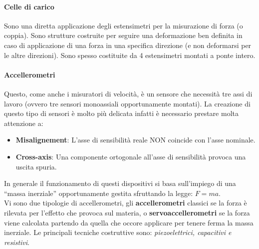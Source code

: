 \documentclass[12pt]{article}
\begin{document}
\paragraph{Celle di carico} Sono una diretta applicazione degli estensimetri per la misurazione di forza (o coppia). Sono strutture costruite per seguire una deformazione ben definita in caso di applicazione di una forza in una specifica direzione (e non deformarsi per le altre direzioni). Sono spesso costituite da 4 estensimetri montati a ponte intero.

\paragraph{Accellerometri} Questo, come anche i misuratori di velocità, è un sensore che necessità tre assi di lavoro (ovvero tre sensori monoassiali opportunamente montati). La creazione di questo tipo di sensori è molto più delicata infatti è necessario prestare molta attenzione a:
\begin{itemize}
  \item \textbf{Misalignement}: L'asse di sensibilità reale NON coincide con l'asse nominale.
  \item \textbf{Cross-axis}: Una componente ortogonale all'asse di sensibilità provoca una uscita spuria.
\end{itemize}
In generale il funzionamento di questi dispositivi si basa sull'impiego di una ``massa inerziale'' opportunamente gestita sfruttando la legge: $F=ma$.\\
Vi sono due tipologie di accellerometri, gli \textbf{accellerometri} classici se la forza è rilevata per l'effetto che provoca sul materia, o \textbf{servoaccellerometri} se la forza viene calcolata partendo da quella che occore applicare per tenere ferma la massa inerziale. Le principali tecniche costruttive sono: \textit{piezoelettrici, capacitivi e resistivi}.
\end{document}
